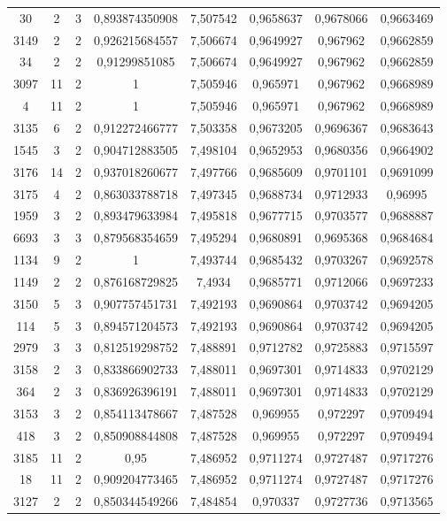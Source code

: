 \begin{longtable}{|c|c|c|c|c|c|c|c|}
30 & 2 & 3 & 0,893874350908 & 7,507542 & 0,9658637 & 0,9678066 & 0,9663469 \\
3149 & 2 & 2 & 0,926215684557 & 7,506674 & 0,9649927 & 0,967962 & 0,9662859 \\
34 & 2 & 2 & 0,91299851085 & 7,506674 & 0,9649927 & 0,967962 & 0,9662859 \\
3097 & 11 & 2 & 1 & 7,505946 & 0,965971 & 0,967962 & 0,9668989 \\
4 & 11 & 2 & 1 & 7,505946 & 0,965971 & 0,967962 & 0,9668989 \\
3135 & 6 & 2 & 0,912272466777 & 7,503358 & 0,9673205 & 0,9696367 & 0,9683643 \\
1545 & 3 & 2 & 0,904712883505 & 7,498104 & 0,9652953 & 0,9680356 & 0,9664902 \\
3176 & 14 & 2 & 0,937018260677 & 7,497766 & 0,9685609 & 0,9701101 & 0,9691099 \\
3175 & 4 & 2 & 0,863033788718 & 7,497345 & 0,9688734 & 0,9712933 & 0,96995 \\
1959 & 3 & 2 & 0,893479633984 & 7,495818 & 0,9677715 & 0,9703577 & 0,9688887 \\
6693 & 3 & 3 & 0,879568354659 & 7,495294 & 0,9680891 & 0,9695368 & 0,9684684 \\
1134 & 9 & 2 & 1 & 7,493744 & 0,9685432 & 0,9703267 & 0,9692578 \\
1149 & 2 & 2 & 0,876168729825 & 7,4934 & 0,9685771 & 0,9712066 & 0,9697233 \\
3150 & 5 & 3 & 0,907757451731 & 7,492193 & 0,9690864 & 0,9703742 & 0,9694205 \\
114 & 5 & 3 & 0,894571204573 & 7,492193 & 0,9690864 & 0,9703742 & 0,9694205 \\
2979 & 3 & 3 & 0,812519298752 & 7,488891 & 0,9712782 & 0,9725883 & 0,9715597 \\
3158 & 2 & 3 & 0,833866902733 & 7,488011 & 0,9697301 & 0,9714833 & 0,9702129 \\
364 & 2 & 3 & 0,836926396191 & 7,488011 & 0,9697301 & 0,9714833 & 0,9702129 \\
3153 & 3 & 2 & 0,854113478667 & 7,487528 & 0,969955 & 0,972297 & 0,9709494 \\
418 & 3 & 2 & 0,850908844808 & 7,487528 & 0,969955 & 0,972297 & 0,9709494 \\
3185 & 11 & 2 & 0,95 & 7,486952 & 0,9711274 & 0,9727487 & 0,9717276 \\
18 & 11 & 2 & 0,909204773465 & 7,486952 & 0,9711274 & 0,9727487 & 0,9717276 \\
3127 & 2 & 2 & 0,850344549266 & 7,484854 & 0,970337 & 0,9727736 & 0,9713565 \\

\end{longtable}
